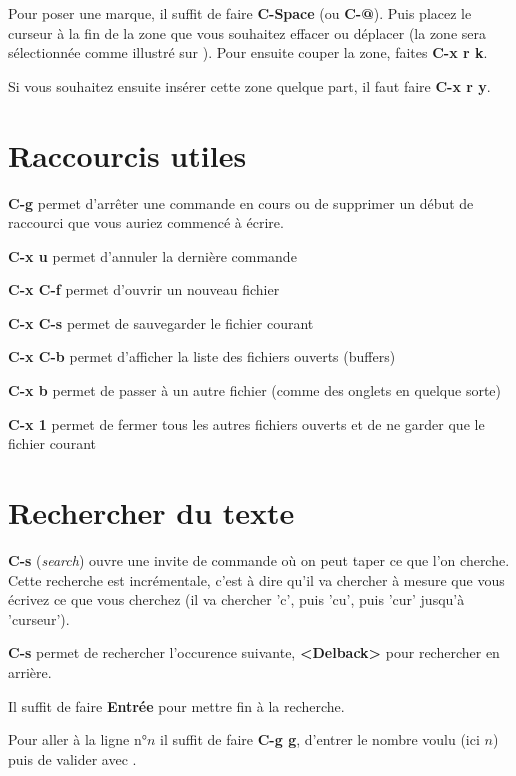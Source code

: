 \documentclass[a4paper,twoside]{article}
\newcommand{\raccourci}[1]{{\bfseries #1}}
\begin{document}
Pour poser une marque, il suffit de faire \raccourci{C-Space} (ou \raccourci{C-@}). Puis placez le curseur à la fin de la zone que vous souhaitez effacer ou déplacer (la zone sera sélectionnée comme illustré sur ). Pour ensuite couper la zone, faites \raccourci{C-x r k}. 

Si vous souhaitez ensuite insérer cette zone quelque part, il faut faire \raccourci{C-x r y}.


\section{Raccourcis utiles}
\begin{important}
\raccourci{C-g} permet d'arrêter une commande en cours ou de supprimer un début de raccourci que vous auriez commencé à écrire.
\end{important}


\raccourci{C-x u} permet d'annuler la dernière commande

\raccourci{C-x C-f} permet d'ouvrir un nouveau fichier

\raccourci{C-x C-s} permet de sauvegarder le fichier courant

\raccourci{C-x C-b} permet d'afficher la liste des fichiers ouverts (buffers)

\raccourci{C-x b} permet de passer à un autre fichier (comme des onglets en quelque sorte)

\raccourci{C-x 1} permet de fermer tous les autres fichiers ouverts et de ne garder que le fichier courant

\section{Rechercher du texte}
\raccourci{C-s} (\emph{search}) ouvre une invite de commande où on peut taper ce que l'on cherche. Cette recherche est incrémentale, c'est à dire qu'il va chercher à mesure que vous écrivez ce que vous cherchez (il va chercher 'c', puis 'cu', puis 'cur' jusqu'à 'curseur').

\raccourci{C-s} permet de rechercher l'occurence suivante, \raccourci{<Delback>} pour rechercher en arrière.

Il suffit de faire \raccourci{Entrée} pour mettre fin à la recherche.

\bigskip

Pour aller à la ligne n°$n$ il suffit de faire \raccourci{C-g g}, d'entrer le nombre voulu (ici $n$) puis de valider avec .
\end{document}

